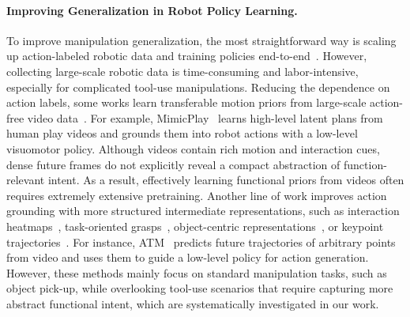 \paragraph{Improving Generalization in Robot Policy Learning.}
To improve manipulation generalization, the most straightforward way is scaling up action-labeled robotic data and training policies end-to-end~\citep{zitkovich2023rt, o2024open, team2024octo, khazatsky2024droid, jia2026physics}. 
However, collecting large-scale robotic data is time-consuming and labor-intensive, especially for complicated tool-use manipulations. 
Reducing the dependence on action labels, some works learn transferable motion priors from large-scale action-free video data~\citep{nair2023r3m, wang2023mimicplay, wu2024unleashing,ma2026dit4dit, pai2025mimic, an2026feedback, hou2026world}. 
For example, MimicPlay~\citep{wang2023mimicplay} learns high-level latent plans from human play videos and grounds them into robot actions with a low-level visuomotor policy. 
Although videos contain rich motion and interaction cues, dense future frames do not explicitly reveal a compact abstraction of function-relevant intent. As a result, effectively learning functional priors from videos often requires extremely extensive pretraining.
Another line of work improves action grounding with more structured intermediate representations, such as interaction heatmaps~\citep{mo2021where2act, bahl2023affordances, wu2025afforddp, li2026compassad}, task-oriented grasps~\citep{fang2020tog}, object-centric representations~\citep{zhulearning, chen2025tool, chapin2025object, cao2026keygen}, or keypoint trajectories~\citep{gao2021kpam, huang2025rekep, turpin2021gift, wen2023any, cao2026keygen}.
For instance, ATM~\citep{wen2023any} predicts future trajectories of arbitrary points from video and uses them to guide a low-level policy for action generation. 
However, these methods mainly focus on standard manipulation tasks, such as object pick-up, while overlooking tool-use scenarios that require capturing more abstract functional intent, which are systematically investigated in our work. 






